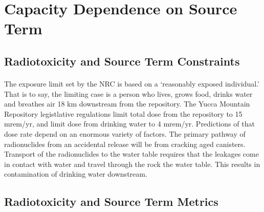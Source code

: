 \section{Capacity Dependence on Source Term}
\subsection{Radiotoxicity and Source Term Constraints}
\paragraph{}
The exposure limit set by the NRC is based on a `reasonably exposed individual.' That is to say, the 
limiting case is a person who lives, grows food, drinks water and breathes air 18 km downstream from 
the repository. The Yucca Mountain Repository legistlative regulations limit total dose from the 
repository to 15 mrem/yr, and limit dose from drinking water to 4 mrem/yr. Predictions of that dose 
rate depend on an enormous variety of factors. The primary pathway of radionuclides from an 
accidental release will be from cracking aged canisters. Transport of the radionuclides to the water 
table requires that the leakages come in contact with water and travel through the rock the water 
table. This results in contamination of drinking water downstream.  \subsection{Radiotoxicity and 
Source Term Metrics}
